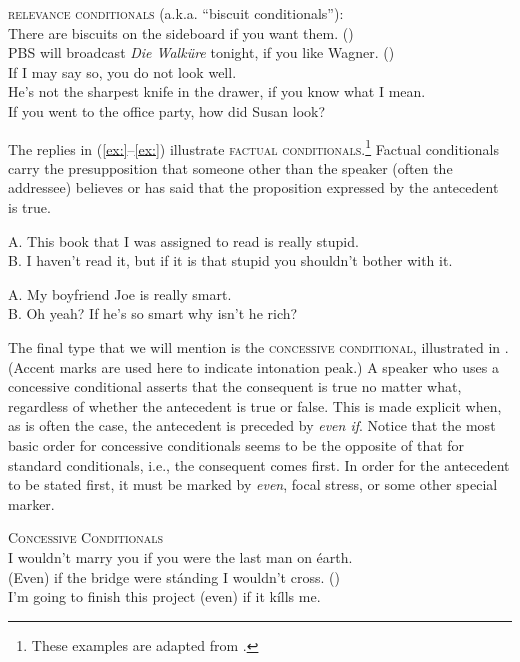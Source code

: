 \ea
\textsc{relevance} \textsc{conditionals} (a.k.a. “biscuit conditionals”):\\
\ea There are biscuits on the sideboard if you want them.  (\citealt{Austin1956})\\
\ex PBS will broadcast \textit{Die Walküre} tonight, if you like Wagner.  (\citealt{Bennet2003})\\
\ex If I may say so, you do not look well.\\
\ex He’s not the sharpest knife in the drawer, if you know what I mean.\\
\ex If you went to the office party, how did Susan look?
                       \z
\z


The replies in (\ref{ex:}--\ref{ex:}) illustrate \textsc{factual} \textsc{conditionals}.\footnote{These examples are adapted from   \citet[671]{BhattPancheva2006}.} Factual conditionals carry the presupposition that someone other than the speaker (often the addressee) believes or has said that the proposition expressed by the antecedent is true.


\ea
A. This book that I was assigned to read is really stupid.\\
B. I haven’t read it, but if it is that stupid you shouldn’t bother with it.
\z

\ea
A. My boyfriend Joe is really smart.\\
B. Oh yeah? If he’s so smart why isn’t he rich?
\z


The final type that we will mention is the \textsc{concessive conditional}, illustrated in . (Accent marks are used here to indicate intonation peak.) A speaker who uses a concessive conditional asserts that the consequent is true no matter what, regardless of whether the antecedent is true or false. This is made explicit when, as is often the case, the antecedent is preceded by \textit{even if}. Notice that the most basic order for concessive conditionals seems to be the opposite of that for standard conditionals, i.e., the consequent comes first. In order for the antecedent to be stated first, it must be marked by \textit{even}, focal stress, or some other special marker.


\ea
\textsc{Concessive Conditionals}\\
\ea I wouldn’t marry you if you were the last man on éarth.\\
\ex (Even) if the bridge were stánding I wouldn’t cross. (\citealt{Bennett1982})\\
\ex I’m going to finish this project (even) if it kílls me.
                       \z
\z


